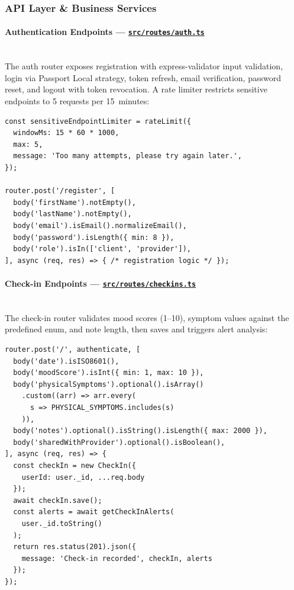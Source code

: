 \documentclass[12pt,letterpaper]{article}
\newcommand{\ghrepo}{https://github.com/omniV1/lunaraCare}
\begin{document}
\subsubsection{API Layer \& Business Services}

\paragraph{Authentication Endpoints --- \href{\ghrepo/blob/main/backend/src/routes/auth.ts}{\texttt{src/routes/auth.ts}}}
\mbox{}\\
The auth router exposes registration with express-validator input validation, login via Passport Local strategy, token refresh, email verification, password reset, and logout with token revocation. A rate limiter restricts sensitive endpoints to 5 requests per 15~minutes:

\begin{lstlisting}[caption={Auth route registration endpoint (\texttt{auth.ts})}]
const sensitiveEndpointLimiter = rateLimit({
  windowMs: 15 * 60 * 1000,
  max: 5,
  message: 'Too many attempts, please try again later.',
});

router.post('/register', [
  body('firstName').notEmpty(),
  body('lastName').notEmpty(),
  body('email').isEmail().normalizeEmail(),
  body('password').isLength({ min: 8 }),
  body('role').isIn(['client', 'provider']),
], async (req, res) => { /* registration logic */ });
\end{lstlisting}

\paragraph{Check-in Endpoints --- \href{\ghrepo/blob/main/backend/src/routes/checkins.ts}{\texttt{src/routes/checkins.ts}}}
\mbox{}\\
The check-in router validates mood scores (1--10), symptom values against the predefined enum, and note length, then saves and triggers alert analysis:

\begin{lstlisting}[caption={Check-in creation endpoint (\texttt{checkins.ts})}]
router.post('/', authenticate, [
  body('date').isISO8601(),
  body('moodScore').isInt({ min: 1, max: 10 }),
  body('physicalSymptoms').optional().isArray()
    .custom((arr) => arr.every(
      s => PHYSICAL_SYMPTOMS.includes(s)
    )),
  body('notes').optional().isString().isLength({ max: 2000 }),
  body('sharedWithProvider').optional().isBoolean(),
], async (req, res) => {
  const checkIn = new CheckIn({
    userId: user._id, ...req.body
  });
  await checkIn.save();
  const alerts = await getCheckInAlerts(
    user._id.toString()
  );
  return res.status(201).json({
    message: 'Check-in recorded', checkIn, alerts
  });
});
\end{lstlisting}
\end{document}
